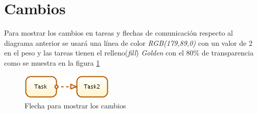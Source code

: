 \section{Cambios}

Para mostrar los cambios en tareas y flechas de comunicación respecto al diagrama anterior se usará una línea de color \textit{RGB(179,89,0)} con un valor de 2 en el peso y las tareas tienen el relleno(\textit{fill})  \textit{Golden} con el 80\% de transparencia como se muestra en la figura \ref{fig:TareasYFlujos}



\begin{figure}[hbtp!]
	\begin{center}
		\includegraphics[width=.3\textwidth]{introduccion/imagenes/procesos/ArrowCambios}
		\caption{Flecha para mostrar los cambios}
		\label{fig:TareasYFlujos}
	\end{center}
\end{figure}



 







